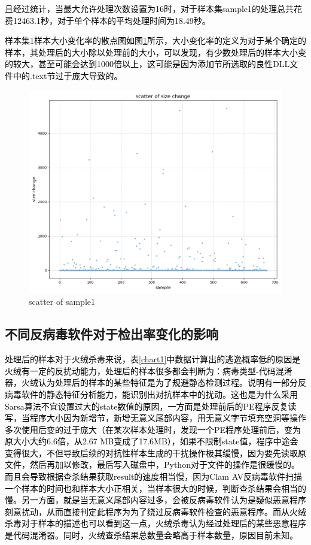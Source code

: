 \textcolor{black}{且经过统计，当最大允许处理次数设置为16时，对于样本集sample1的处理总共花费12463.1秒，对于单个样本的平均处理时间为18.49秒。}

\textcolor{black}{样本集1样本大小变化率的散点图如图\ref{fig:scatter_of_sample1}所示，大小变化率的定义为对于某个确定的样本，其处理后的大小除以处理前的大小，可以发现，有少数处理后的样本大小变的较大，甚至可能会达到1000倍以上，这可能是因为添加节所选取的良性DLL文件中的.text节过于庞大导致的。}

\begin{figure}
  \centering
  \includegraphics[scale=0.50]{images/scatter_of_sample1.png}
  \caption{scatter of sample1}\label{fig:scatter_of_sample1}
\end{figure}

\subsection{不同反病毒软件对于检出率变化的影响}

\textcolor{black}{处理后的样本对于火绒杀毒来说，表\ref{chart1}中数据计算出的逃逸概率低的原因是火绒有一定的反扰动能力，处理后的样本很多都会判断为：病毒类型-代码混淆器，火绒认为处理后的样本的某些特征是为了规避静态检测过程。说明有一部分反病毒软件的静态特征分析能力，能识别出对抗样本中的扰动。这也是为什么采用Sarsa算法不宜设置过大的state数值的原因，一方面是处理前后的PE程序反复读写，当程序大小因为新增节，新增无意义尾部内容，用无意义字节填充空洞等操作多次使用后变的过于庞大（在某次样本处理时，发现一个PE程序处理前后，变为原大小大约6.6倍，从2.67 MB变成了17.6MB），如果不限制state值，程序中途会变得很大，不但导致后续的对抗性样本生成的干扰操作极其缓慢，因为要先读取原文件，然后再加以修改，最后写入磁盘中，Python对于文件的操作是很缓慢的。而且会导致根据查杀结果获取result的速度相当慢，因为Clam AV反病毒软件扫描一个样本的时间也和样本大小正相关，当样本很大的时候，判断查杀结果会相当的慢。另一方面，就是当无意义尾部内容过多，会被反病毒软件认为是疑似恶意程序刻意扰动，从而直接判定此程序为为了绕过反病毒软件检查的恶意程序。而从火绒杀毒对于样本的描述也可以看到这一点，火绒杀毒认为经过处理后的某些恶意程序是代码混淆器。同时，火绒查杀结果总数量会略高于样本数量，原因目前未知。}

